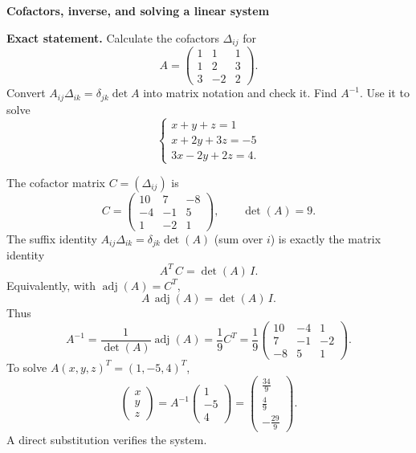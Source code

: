 \begin{problem}[CP-I-0032]
\label{prob:cp-i-0032}
\textbf{Cofactors, inverse, and solving a linear system}

\textbf{Exact statement.}
\hspace*{1.5em}Calculate the cofactors \(\Delta_{ij}\) for
\[
A=\begin{pmatrix}
	1&1&1\\
	1&2&3\\
	3&-2&2
\end{pmatrix}.
\]
Convert \(A_{ij}\Delta_{ik}=\delta_{jk}\det A\) into matrix notation and check it.
Find \(A^{-1}\).
Use it to solve
\[
\begin{cases}
	x+y+z=1\\
	x+2y+3z=-5\\
	3x-2y+2z=4.
\end{cases}
\]

\end{problem}

\begin{solution}
The cofactor matrix \(C=(\Delta_{ij})\) is
\[
C=\begin{pmatrix}
	10&7&-8\\
	-4&-1&5\\
	1&-2&1
\end{pmatrix},
\qquad \det(A)=9.
\]
The suffix identity \(A_{ij}\Delta_{ik}=\delta_{jk}\det(A)\) (sum over \(i\)) is exactly the matrix identity
\[
A^T\,C=\det(A)\,I.
\]
Equivalently, with \(\operatorname{adj}(A)=C^T\),
\[
A\,\operatorname{adj}(A)=\det(A)\,I.
\]
Thus
\[
A^{-1}=\frac{1}{\det(A)}\operatorname{adj}(A)=\frac{1}{9}C^T
=\frac{1}{9}\begin{pmatrix}
	10&-4&1\\
	7&-1&-2\\
	-8&5&1
\end{pmatrix}.
\]
To solve \(A(x,y,z)^T=(1,-5,4)^T\),
\[
\begin{pmatrix}x\\y\\z\end{pmatrix}
=A^{-1}\begin{pmatrix}1\\-5\\4\end{pmatrix}
=\begin{pmatrix}\frac{34}{9}\\[2pt]\frac{4}{9}\\[2pt]-\frac{29}{9}\end{pmatrix}.
\]
A direct substitution verifies the system.
\end{solution}

